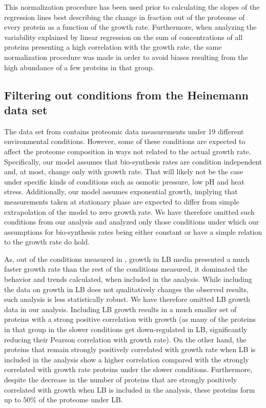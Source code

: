 \documentclass[notitlepage]{article}
\begin{document}
This normalization procedure has been used prior to calculating the slopes of the regression lines best describing the change in fraction out of the proteome of every protein as a function of the growth rate.
Furthermore, when analyzing the variability explained by linear regression on the sum of concentrations of all proteins presenting a high correlation with the growth rate, the same normalization procedure was made in order to avoid biases resulting from the high abundance of a few proteins in that group.
\subsection{Filtering out conditions from the Heinemann data set}
\label{heinemanncond}
The data set from \cite{Heinemann2014} contains proteomic data measurements under 19 different environmental conditions.
However, some of these conditions are expected to affect the proteome composition in ways not related to the actual growth rate.
Specifically, our model assumes that bio-synthesis rates are condition independent and, at most, change only with growth rate.
That will likely not be the case under specific kinds of conditions such as osmotic pressure, low pH and heat stress.
Additionally, our model assumes exponential growth, implying that measurements taken at stationary phase are expected to differ from simple extrapolation of the model to zero growth rate.
We have therefore omitted such conditions from our analysis and analyzed only those conditions under which our assumptions for bio-synthesis rates being either constant or have a simple relation to the growth rate do hold.

As, out of the conditions measured in \cite{Heinemann2014}, growth in LB media presented a much faster growth rate than the rest of the conditions measured, it dominated the behavior and trends calculated, when included in the analysis.
While including the data on growth in LB does not qualitatively changes the observed results, such analysis is less statistically robust.
We have therefore omitted LB growth data in our analysis.
Including LB growth results in a much smaller set of proteins with a strong positive correlation with growth (as many of the proteins in that group in the slower conditions get down-regulated in LB, significantly reducing their Pearson correlation with growth rate).
On the other hand, the proteins that remain strongly positively correlated with growth rate when LB is included in the analysis show a higher correlation compared with the strongly correlated with growth rate proteins under the slower conditions.
Furthermore, despite the decrease in the number of proteins that are strongly positively correlated with growth when LB is included in the analysis, these proteins form up to $50\%$ of the proteome under LB.
\end{document}
